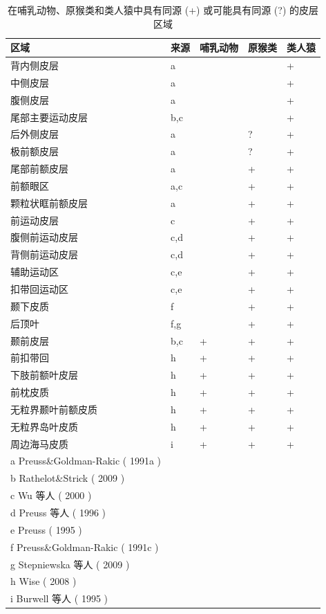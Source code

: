 \begin{table}[htbp]
	\centering
	\caption{在哺乳动物、原猴类和类人猿中具有同源 (+) 或可能具有同源 (?) 的皮层区域}
	\setlength{\tabcolsep}{8mm}	
	\renewcommand\arraystretch{1.5}	
	\begin{tabular}{lllll}
		\toprule
		区域 & 来源 & 哺乳动物 & 原猴类 & 类人猿 \\
		\midrule
		背内侧皮层 & a & & &+  \\
		中侧皮层 & a & & &+  \\
		腹侧皮层 & a & & &+  \\
		尾部主要运动皮层 & b,c & & &+  \\
		后外侧皮层 & a & &? &+  \\
		极前额皮层&  a & &? &+  \\
		尾部前额皮层&  a & &+ &+  \\
		前额眼区& a,c & &+ &+  \\
		颗粒状眶前额皮层& a & &+ &+  \\
		前运动皮层& c & &+ &+   \\
		腹侧前运动皮层& c,d & &+ &+  \\
		背侧前运动皮层& c,d & &+ &+  \\
		辅助运动区& c,e & &+ &+  \\
		扣带回运动区& c,e & &+ &+   \\
		颞下皮质& f & &+ &+   \\
		后顶叶 & f,g & &+ &+  \\
		颞前皮层 &  b,c &+ &+ &+  \\
		前扣带回 &  h &+ &+ &+  \\
		下肢前额叶皮层 & h &+ &+ &+  \\
		前枕皮质 & h &+ &+ &+  \\
		无粒界颞叶前额皮质 & h &+ &+ &+  \\
		无粒界岛叶皮质 & h &+ &+ &+  \\
		周边海马皮质 & i &+ &+ &+  \\
		\bottomrule
		a Preuss\&Goldman-Rakic (  1991a  ) \\
		b Rathelot\&Strick (  2009  )\\
		c Wu 等人 (  2000  )\\
		d Preuss 等人 (  1996  ) \\
		e Preuss (  1995  ) \\
		f Preuss\&Goldman-Rakic (  1991c  ) \\
		g Stepniewska 等人 (  2009  ) \\
		h Wise (  2008  ) \\
		i Burwell 等人 (  1995  )
	\end{tabular}%
\end{table}%

